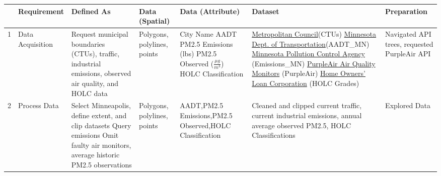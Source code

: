 \documentclass[article,12pt]{article}
\numberwithin{equation}{section}
\begin{document}
\begin{adjustwidth}{-.88in}{-.88in}
{
	\scriptsize
	\begin{tabular}{|l|p{.11\linewidth}|p{.17\linewidth}|p{.065\linewidth}|p{.125\linewidth}|p{.23\linewidth}|p{.15\linewidth}|}
		\hline	& \textbf{Requirement} & \textbf{Defined As} & \textbf{Data (Spatial)} & \textbf{Data} \newline \textbf{(Attribute)} & \textbf{Dataset} & \textbf{Preparation} \\ \hline
		1 &  Data Acquisition      &    Request municipal boundaries (CTUs), traffic, industrial emissions, observed air quality, and HOLC data                                                             & Polygons, polylines, points \vspace{.04in}        & City Name \newline\newline AADT \newline\newline PM2.5 Emissions \newline (lbs) \newline PM2.5 Observed \newline ($\frac{\mu g}{m^3}$) \newline HOLC \newline Classification                                       &  \href{https://gisdata.mn.gov/dataset/us-mn-state-metc-bdry-census2010counties-ctus}{Metropolitan Council}\newline (CTUs) \newline
		\href{https://gisdata.mn.gov/dataset/trans-aadt-traffic-count-locs}{Minnesota Dept. of Transportation}\newline (AADT\_MN) \newline \href{https://www.pca.state.mn.us/air/permitted-facility-air-emissions-data}{Minnesota Pollution Control Agency} \newline (Emissions\_MN) \newline 
		\href{https://api.purpleair.com/}{PurpleAir Air Quality Monitors} \newline
		(PurpleAir) \newline
		\href{https://gisdata.mn.gov/dataset/us-mn-state-metc-plan-historic-holc-appraisal}{Home Owners' Loan Corporation} \newline (HOLC Grades) \newline &       Navigated API trees, requested PurpleAir API \\ \hline
		2 & Process Data & Select Minneapolis, define extent, and clip datasets \newline Query emissions \newline Omit faulty air monitors, average historic PM2.5 observations & Polygons, polylines, points & AADT,\newline PM2.5 Emissions,\newline PM2.5 Observed,\newline HOLC Classification  & Cleaned and clipped current traffic, current industrial emissions, annual average observed PM2.5, HOLC Classifications &  Explored Data \\ \hline

\end{tabular}}
\end{adjustwidth}
\end{document}
